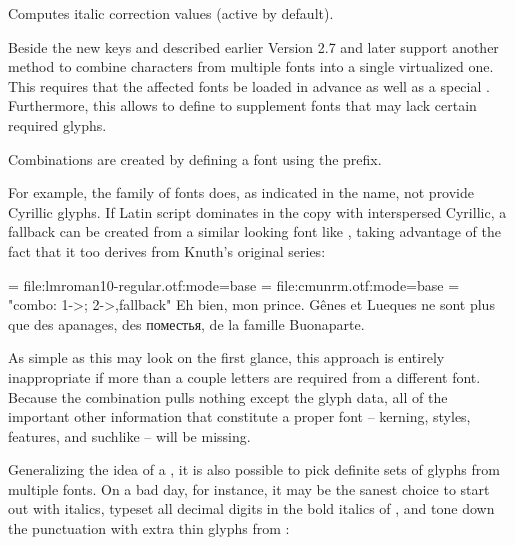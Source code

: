           Computes italic correction values (active by default).
  \endaltitem

\enddescriptions

\endsubsection

\endsection

Beside the new keys  and  described earlier
Version 2.7 and later support another method to combine characters from multiple fonts into a
single virtualized one. This requires that the affected fonts be loaded in
advance as well as a special . Furthermore, this
allows to define  to supplement fonts that may lack
certain required glyphs.

Combinations are created by defining a font using the  prefix.


For example, the  family of fonts does, as indicated
in the name, not provide Cyrillic glyphs. If Latin script dominates in the copy
with interspersed Cyrillic, a fallback can be created from a similar looking
font like , taking advantage of the fact
that it too derives from Knuth’s original  series:

\beginlisting
  
  \font \lm  = file:lmroman10-regular.otf:mode=base
  \font \cmu = file:cmunrm.otf:mode=base
  \font \lmu = "combo: 1->\fontid\lm; 2->\fontid\cmu,fallback"
  \lmu Eh bien, mon prince. Gênes et Lueques ne sont plus que des
       apanages, des поместья, de la famille Buonaparte.
  \bye
\endlisting

As simple as this may look on the first glance, this approach is entirely
inappropriate if more than a couple letters are required from a different font.
Because the combination pulls nothing except the glyph data, all of the
important other information that constitute a proper font -- kerning, styles,
features, and suchlike -- will be missing.

\endsubsection %


Generalizing the idea of a , it is also possible to
pick definite sets of glyphs from multiple fonts. On a bad day, for instance,
it may be the sanest choice to start out with  italics,
typeset all decimal digits in the bold italics of ,
and tone down the punctuation with extra thin glyphs from :

